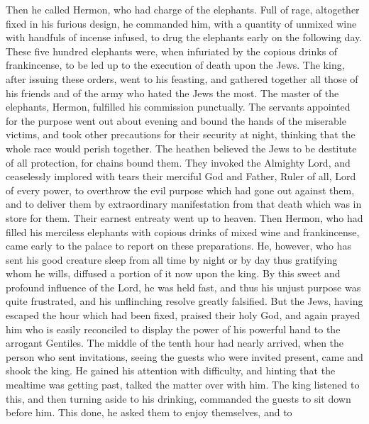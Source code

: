  Then he called Hermon, who had charge of the elephants.
Full of rage, altogether fixed in his furious design,  he
commanded him, with a quantity of unmixed wine with handfuls of incense
infused, to drug the elephants early on the following day. These five
hundred elephants were, when infuriated by the copious drinks of
frankincense, to be led up to the execution of death upon the Jews.
 The king, after issuing these orders, went to his
feasting, and gathered together all those of his friends and of the army
who hated the Jews the most.  The master of the elephants,
Hermon, fulfilled his commission punctually.  The servants
appointed for the purpose went out about evening and bound the hands of
the miserable victims, and took other precautions for their security at
night, thinking that the whole race would perish together.
 The heathen believed the Jews to be destitute of all
protection, for chains bound them.  They invoked the
Almighty Lord, and ceaselessly implored with tears their merciful God
and Father, Ruler of all, Lord of every power,  to
overthrow the evil purpose which had gone out against them, and to
deliver them by extraordinary manifestation from that death which was in
store for them.  Their earnest entreaty went up to heaven.
 Then Hermon, who had filled his merciless elephants with
copious drinks of mixed wine and frankincense, came early to the palace
to report on these preparations.  He, however, who has
sent his good creature sleep from all time by night or by day thus
gratifying whom he wills, diffused a portion of it now upon the king.
 By this sweet and profound influence of the Lord, he was
held fast, and thus his unjust purpose was quite frustrated, and his
unflinching resolve greatly falsified.  But the Jews,
having escaped the hour which had been fixed, praised their holy God,
and again prayed him who is easily reconciled to display the power of
his powerful hand to the arrogant Gentiles.  The middle
of the tenth hour had nearly arrived, when the person who sent
invitations, seeing the guests who were invited present, came and shook
the king.  He gained his attention with difficulty, and
hinting that the mealtime was getting past, talked the matter over with
him.  The king listened to this, and then turning aside
to his drinking, commanded the guests to sit down before him.
 This done, he asked them to enjoy themselves, and to
